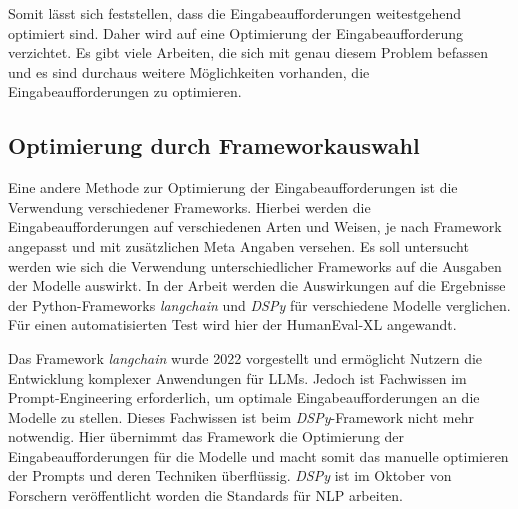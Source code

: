 Somit lässt sich feststellen, dass die Eingabeaufforderungen weitestgehend optimiert sind. Daher wird auf eine Optimierung der Eingabeaufforderung verzichtet. Es gibt viele Arbeiten, die sich mit genau diesem Problem befassen und es sind durchaus weitere Möglichkeiten vorhanden, die Eingabeaufforderungen zu optimieren.\vspace{0.2cm}


\subsection{Optimierung durch Frameworkauswahl}
Eine andere Methode zur Optimierung der Eingabeaufforderungen ist die Verwendung verschiedener Frameworks. Hierbei werden die Eingabeaufforderungen auf verschiedenen Arten und Weisen, je nach Framework angepasst und mit zusätzlichen Meta Angaben versehen. Es soll untersucht werden wie sich die Verwendung unterschiedlicher Frameworks auf die Ausgaben der Modelle auswirkt. In der Arbeit werden die Auswirkungen auf die Ergebnisse der Python-Frameworks \textit{langchain} und \textit{DSPy} für verschiedene Modelle verglichen. Für einen automatisierten Test wird hier der HumanEval-XL angewandt.\vspace{0.2cm}

Das Framework \textit{langchain} wurde 2022 vorgestellt und ermöglicht Nutzern die Entwicklung komplexer Anwendungen für LLMs. Jedoch ist Fachwissen im Prompt-Engineering erforderlich, um optimale Eingabeaufforderungen an die Modelle zu stellen. Dieses Fachwissen ist beim \textit{DSPy}-Framework nicht mehr notwendig. Hier übernimmt das Framework die Optimierung der Eingabeaufforderungen für die Modelle und macht somit das manuelle optimieren der Prompts und deren Techniken überflüssig. \textit{DSPy} ist im Oktober von Forschern veröffentlicht worden die Standards für NLP arbeiten.\vspace{0.2cm}



